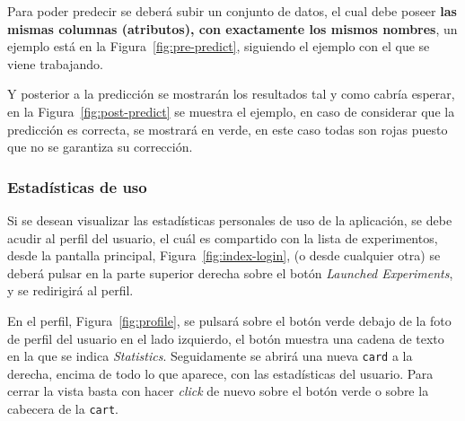 Para poder predecir se deberá subir un conjunto de datos, el cual debe poseer \textbf{las mismas columnas (atributos), con exactamente los mismos nombres}, un ejemplo está en la Figura~\ref{fig:pre-predict}, siguiendo el ejemplo con el que se viene trabajando.


Y posterior a la predicción se mostrarán los resultados tal y como cabría esperar, en la Figura~\ref{fig:post-predict} se muestra el ejemplo, en caso de considerar que la predicción es correcta, se mostrará en verde, en este caso todas son rojas puesto que no se garantiza su corrección.


\subsubsection{Estadísticas de uso}
Si se desean visualizar las estadísticas personales de uso de la aplicación, se debe acudir al perfil del usuario, el cuál es compartido con la lista de experimentos, desde la pantalla principal, Figura~\ref{fig:index-login}, (o desde cualquier otra) se deberá pulsar en la parte superior derecha sobre el botón \textit{Launched Experiments}, y se redirigirá al perfil. 

En el perfil, Figura~\ref{fig:profile}, se pulsará sobre el botón verde debajo de la foto de perfil del usuario en el lado izquierdo, el botón muestra una cadena de texto en la que se indica \textit{Statistics}. Seguidamente se abrirá una nueva \texttt{card} a la derecha, encima de todo lo que aparece, con las estadísticas del usuario. Para cerrar la vista basta con hacer \textit{click} de nuevo sobre el botón verde o sobre la cabecera de la \texttt{cart}. 

